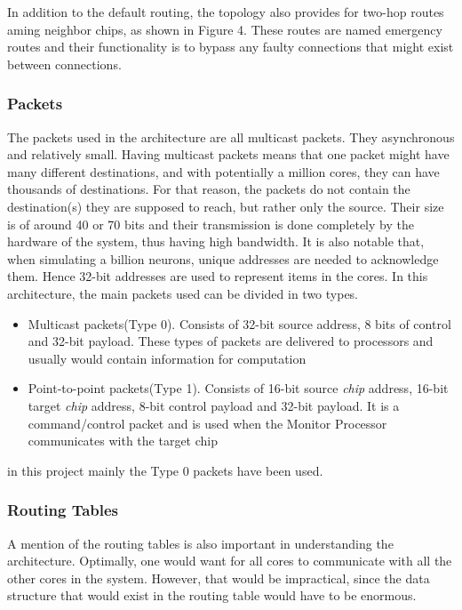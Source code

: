 \documentclass[12pt,a4paper]{article}
\begin{document}
In addition to the default routing, the topology also provides for two-hop routes aming neighbor chips, as shown in Figure 4. These routes are named emergency routes and their functionality is to bypass any faulty connections that might exist between connections\cite{navaridas2009understanding}\cite{plana2007gals}.

\subsubsection{Packets}
The packets used in the architecture are all multicast packets. They asynchronous and relatively small. Having multicast packets means that one packet might have many different destinations, and with potentially a million cores, they can have thousands of destinations. For that reason, the packets do not contain the destination(s) they are supposed to reach, but rather only the source. Their size is of around 40 or 70 bits and their transmission is done completely by the hardware of the system, thus having high bandwidth\cite{spinnweb}\cite{navaridas2009understanding}. It is also notable that, when simulating a billion neurons, unique addresses are needed to acknowledge them. Hence 32-bit addresses are used to represent items in the cores. In this architecture, the main packets used can be divided in two types.
\begin{itemize}
\item Multicast packets(Type 0). Consists of 32-bit source address, 8 bits of control and 32-bit payload. These types of packets are delivered to processors and usually would contain information for computation
\item Point-to-point packets(Type 1). Consists of 16-bit source \emph{chip} address, 16-bit target \emph{chip} address, 8-bit control payload and 32-bit payload. It is a command/control packet and is used when the Monitor Processor communicates with the target chip\cite{docfile}
\end{itemize}

in this project mainly the Type 0 packets have been used.
\subsubsection{Routing Tables}
A mention of the routing tables is also important in understanding the architecture. Optimally, one would want for all cores to communicate with all the other cores in the system. However, that would be impractical, since the data structure that would exist in the routing table would have to be enormous.
\end{document}
